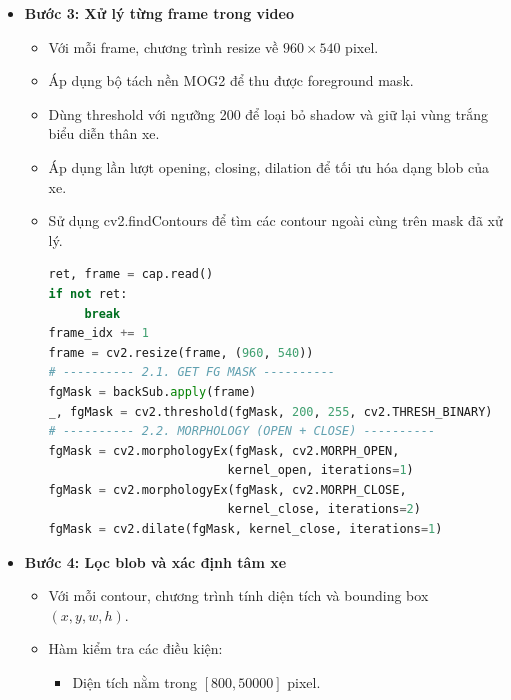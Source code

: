 \begin{itemize}
\begin{itemize}[label={--}]
\begin{lstlisting}[language=Python]
kernel_open  = cv2.getStructuringElement(cv2.MORPH_ELLIPSE, KERNEL_OPEN_SIZE)
kernel_close = cv2.getStructuringElement(cv2.MORPH_ELLIPSE, KERNEL_CLOSE_SIZE)
                    \end{lstlisting}
               \end{itemize}
               \item \textbf{Bước 3: Xử lý từng frame trong video}
               \begin{itemize}[label={--}]
                    \item Với mỗi frame, chương trình resize về $960\times540$ pixel.
                    \item Áp dụng bộ tách nền MOG2 để thu được foreground mask.
                    \item Dùng threshold với ngưỡng 200 để loại bỏ shadow và giữ lại vùng trắng biểu diễn thân xe.
                    \item Áp dụng lần lượt opening, closing, dilation để tối ưu hóa dạng blob của xe.
                    \item Sử dụng cv2.findContours để tìm các contour ngoài cùng trên mask đã xử lý.
                    \begin{lstlisting}[language=Python]
ret, frame = cap.read()
if not ret:
     break
frame_idx += 1
frame = cv2.resize(frame, (960, 540))
# ---------- 2.1. GET FG MASK ----------
fgMask = backSub.apply(frame)
_, fgMask = cv2.threshold(fgMask, 200, 255, cv2.THRESH_BINARY)
# ---------- 2.2. MORPHOLOGY (OPEN + CLOSE) ----------
fgMask = cv2.morphologyEx(fgMask, cv2.MORPH_OPEN,
                         kernel_open, iterations=1)
fgMask = cv2.morphologyEx(fgMask, cv2.MORPH_CLOSE,
                         kernel_close, iterations=2)
fgMask = cv2.dilate(fgMask, kernel_close, iterations=1)
                    \end{lstlisting}
               \end{itemize}
               \item \textbf{Bước 4: Lọc blob và xác định tâm xe}
               \begin{itemize}
                    \item Với mỗi contour, chương trình tính diện tích và bounding box $(x, y, w, h)$.
                    \item Hàm  kiểm tra các điều kiện:
                    \begin{itemize}[label={+}]
                         \item Diện tích nằm trong $[800, 50000]$ pixel.

\end{itemize}
\end{itemize}
\end{itemize}
